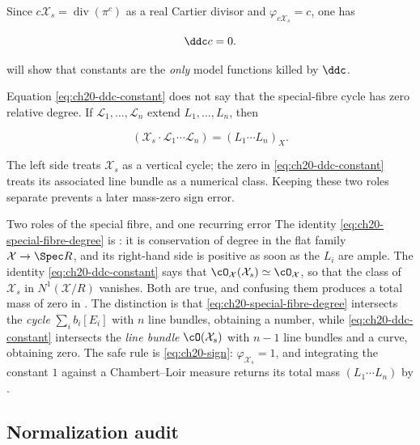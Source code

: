 Since $c\mathcal X_s=\operatorname{div}(\pi^c)$ as
a real Cartier divisor and $\varphi_{c\mathcal X_s}=c$, one has

\begin{equation}
\label{eq:ch20-ddc-constant}
                            \ddc c=0.
\end{equation}

 will show that constants are the \emph{only}
model functions killed by $\ddc$.

Equation \eqref{eq:ch20-ddc-constant} does not say that the special-fibre
cycle has zero relative degree.  If
$\mathcal L_1,\ldots,\mathcal L_n$ extend $L_1,\ldots,L_n$, then

\begin{equation}
\label{eq:ch20-special-fibre-degree}
 (\mathcal X_s\cdot\mathcal L_1\cdots\mathcal L_n)
                  =(L_1\cdots L_n)_X.
\end{equation}

The left side treats $\mathcal X_s$ as a vertical cycle; the zero in
\eqref{eq:ch20-ddc-constant} treats its associated line bundle as a
numerical class.  Keeping these two roles separate prevents a later
mass-zero sign error.

\begin{warning}{Two roles of the special fibre, and one recurring error}
The identity \eqref{eq:ch20-special-fibre-degree} is
: it is conservation of degree in the flat
family $\mathcal X\to\Spec R$, and its right-hand side is positive as soon
as the $L_i$ are ample.  The identity \eqref{eq:ch20-ddc-constant} says
that $\cO_{\mathcal X}(\mathcal X_s)\simeq\cO_{\mathcal X}$, so that the
class of $\mathcal X_s$ in $N^1(\mathcal X/R)$ vanishes.  Both are true,
and confusing them produces a total mass of zero in
.  The distinction is that
\eqref{eq:ch20-special-fibre-degree} intersects the \emph{cycle}
$\sum_ib_i[E_i]$ with $n$ line bundles, obtaining a number, while
\eqref{eq:ch20-ddc-constant} intersects the \emph{line bundle}
$\cO(\mathcal X_s)$ with $n-1$ line bundles and a curve, obtaining
zero.  The safe rule is \eqref{eq:ch20-sign}: $\varphi_{\mathcal X_s}=1$,
and integrating the constant $1$ against a Chambert--Loir measure returns
its total mass $(L_1\cdots L_n)$ by
.
\end{warning}

\subsection{Normalization audit}
\label{sec:ch20-normalization-audit}


